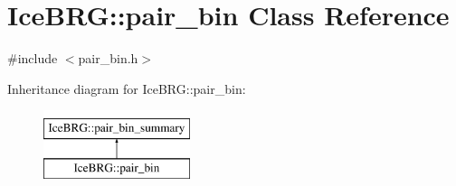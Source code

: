 \hypertarget{classIceBRG_1_1pair__bin}{}\section{Ice\+B\+R\+G\+:\+:pair\+\_\+bin Class Reference}
\label{classIceBRG_1_1pair__bin}


{\ttfamily \#include $<$pair\+\_\+bin.\+h$>$}

Inheritance diagram for Ice\+B\+R\+G\+:\+:pair\+\_\+bin\+:\begin{figure}[H]
\begin{center}
\leavevmode
\includegraphics[height=2.000000cm]{classIceBRG_1_1pair__bin}
\end{center}
\end{figure}

